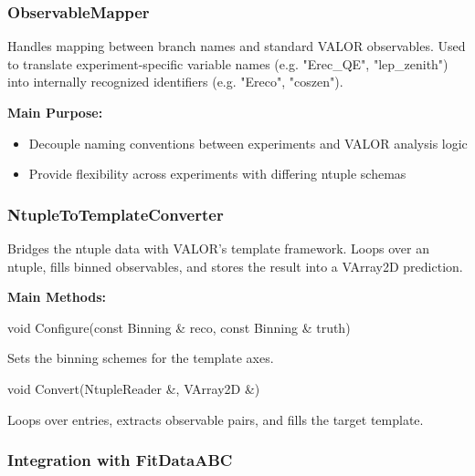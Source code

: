 \vspace{1em}
\subsubsection*{\color{cadmiumgreen}\bf ObservableMapper}

Handles mapping between branch names and standard VALOR observables.  
Used to translate experiment-specific variable names (e.g. {\color{amber}"Erec\_QE"}, {\color{amber}"lep\_zenith"}) into internally recognized identifiers (e.g. {\color{amber}"Ereco"}, {\color{amber}"coszen"}).

\noindent\textbf{Main Purpose:}
\begin{itemize}
  \item Decouple naming conventions between experiments and VALOR analysis logic
  \item Provide flexibility across experiments with differing ntuple schemas
\end{itemize}

\vspace{1em}
\subsubsection*{\color{cadmiumgreen}\bf NtupleToTemplateConverter}

Bridges the ntuple data with VALOR’s template framework.  
Loops over an ntuple, fills binned observables, and stores the result into a {\color{cadmiumgreen} VArray2D} prediction.

\vspace{0.5em}
\noindent\textbf{Main Methods:}

\begin{description}[align=left]

  \item[] {\color{cadmiumred} void Configure(const Binning \& reco, const Binning \& truth)}

  Sets the binning schemes for the template axes.

  \item[] {\color{cadmiumred} void Convert(NtupleReader \&, VArray2D \&)}

  Loops over entries, extracts observable pairs, and fills the target template.

\end{description}

\vspace{1em}
\subsubsection*{Integration with FitDataABC}

